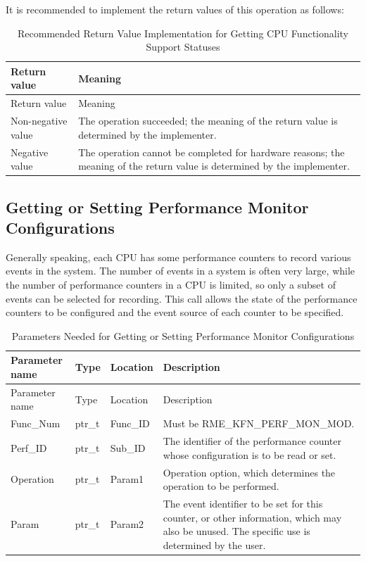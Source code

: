 It is recommended to implement the return values of this operation as follows:

\begin{xltabular}{\textwidth}{@{}>{\hsize\raggedright\arraybackslash}X>{\hsize\raggedright\arraybackslash}X@{}}
\caption{Recommended Return Value Implementation for Getting CPU Functionality Support Statuses}\label{tab:8-59-get-cpu-features-suggested-return-values}\\
\toprule
Return value & Meaning\tabularnewline
\endfirsthead
\toprule
Return value & Meaning\tabularnewline
\midrule
\endhead
\bottomrule
\endlastfoot
    Non-negative value & The operation succeeded; the meaning of the return value is determined by the implementer.\tabularnewline
    Negative value & The operation cannot be completed for hardware reasons; the meaning of the return value is determined by the implementer.\tabularnewline
\end{xltabular}
\nopagebreak[4]

\subsection{Getting or Setting Performance Monitor Configurations}\label{subsec:8-get-or-set-performance-monitor-configuration}

Generally speaking, each CPU has some performance counters to record various events in the system. The number of events in a system is often very large, while the number of performance counters in a CPU is limited, so only a subset of events can be selected for recording. This call allows the state of the performance counters to be configured and the event source of each counter to be specified.

\begin{xltabular}{\textwidth}{@{}>{\hsize\raggedright\arraybackslash}X>{\hsize\raggedright\arraybackslash}X>{\hsize\raggedright\arraybackslash}X>{\hsize\raggedright\arraybackslash}X@{}}
\caption{Parameters Needed for Getting or Setting Performance Monitor Configurations}\label{tab:8-60-get-or-set-performance-monitor-configuration-parameters}\\
\toprule
Parameter name & Type & Location & Description\tabularnewline
\endfirsthead
\toprule
Parameter name & Type & Location & Description\tabularnewline
\midrule
\endhead
\bottomrule
\endlastfoot
Func\_Num & ptr\_t & Func\_ID & Must be RME\_KFN\_PERF\_MON\_MOD.\tabularnewline
Perf\_ID & ptr\_t & Sub\_ID &
The identifier of the performance counter whose configuration is to be read or set.\tabularnewline
Operation & ptr\_t & Param1 &
Operation option, which determines the operation to be performed.\tabularnewline
Param & ptr\_t & Param2 &
The event identifier to be set for this counter, or other information, which may also be unused. The specific use is determined by the user.\tabularnewline
\end{xltabular}
\nopagebreak[4]

